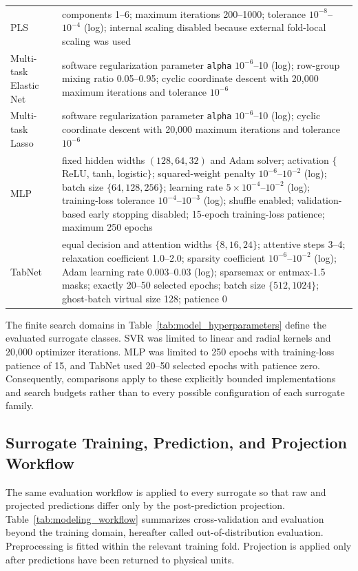 \documentclass[a4paper,fleqn]{cas-sc}
\newcommand{\csvcomma}{,}
\begin{document}
\begin{table}[htbp]
\begin{tabular}{p{2.0cm}p{8.7cm}}
PLS & components 1--6; maximum iterations 200--1000; tolerance $10^{-8}$--$10^{-4}$ (log); internal scaling disabled because external fold-local scaling was used \\
Multi-task Elastic Net & software regularization parameter \texttt{alpha} $10^{-6}$--10 (log); row-group mixing ratio 0.05--0.95; cyclic coordinate descent with 20\csvcomma{}000 maximum iterations and tolerance $10^{-6}$ \\
Multi-task Lasso & software regularization parameter \texttt{alpha} $10^{-6}$--10 (log); cyclic coordinate descent with 20\csvcomma{}000 maximum iterations and tolerance $10^{-6}$ \\
MLP & fixed hidden widths $(128\csvcomma{}64\csvcomma{}32)$ and Adam solver; activation $\{$ReLU\csvcomma{} tanh\csvcomma{} logistic$\}$; squared-weight penalty $10^{-6}$--$10^{-2}$ (log); batch size $\{64\csvcomma{}128\csvcomma{}256\}$; learning rate $5\times10^{-4}$--$10^{-2}$ (log); training-loss tolerance $10^{-4}$--$10^{-3}$ (log); shuffle enabled; validation-based early stopping disabled; 15-epoch training-loss patience; maximum 250 epochs \\
TabNet & equal decision and attention widths $\{8\csvcomma{}16\csvcomma{}24\}$; attentive steps 3--4; relaxation coefficient 1.0--2.0; sparsity coefficient $10^{-6}$--$10^{-2}$ (log); Adam learning rate 0.003--0.03 (log); sparsemax or entmax-1.5 masks; exactly 20--50 selected epochs; batch size $\{512\csvcomma{}1024\}$; ghost-batch virtual size 128; patience 0 \\
\hline
\end{tabular}
\end{table}

The finite search domains in Table~\ref{tab:model_hyperparameters} define the evaluated surrogate classes. SVR was limited to linear and radial kernels and 20,000 optimizer iterations. MLP was limited to 250 epochs with training-loss patience of 15, and TabNet used 20--50 selected epochs with patience zero. Consequently, comparisons apply to these explicitly bounded implementations and search budgets rather than to every possible configuration of each surrogate family.

\subsection{Surrogate Training, Prediction, and Projection Workflow}

The same evaluation workflow is applied to every surrogate so that raw and projected predictions differ only by the post-prediction projection. Table~\ref{tab:modeling_workflow} summarizes cross-validation and evaluation beyond the training domain, hereafter called out-of-distribution evaluation. Preprocessing is fitted within the relevant training fold. Projection is applied only after predictions have been returned to physical units.
\end{document}
